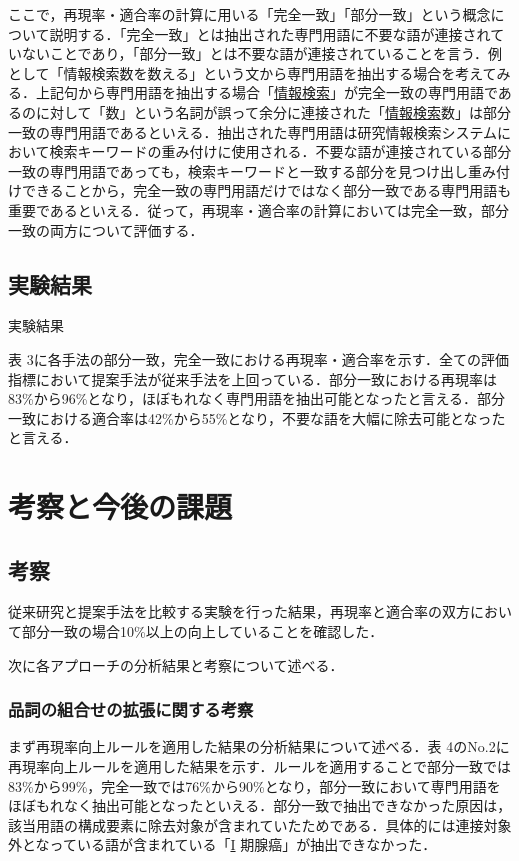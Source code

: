 \documentclass[japanese]{jnlp_1.4}
\begin{document}
ここで，再現率・適合率の計算に用いる「完全一致」「部分一致」という概念について説明する．「完全一致」とは抽出された専門用語に不要な語が連接されていないことであり，「部分一致」とは不要な語が連接されていることを言う．例として「情報検索数を数える」という文から専門用語を抽出する場合を考えてみる．上記句から専門用語を抽出する場合「\ul{情報検索}」が完全一致の専門用語であるのに対して「数」という名詞が誤って余分に連接された「\ul{情報検索}数」は部分一致の専門用語であるといえる．抽出された専門用語は研究情報検索システムにおいて検索キーワードの重み付けに使用される．不要な語が連接されている部分一致の専門用語であっても，検索キーワードと一致する部分を見つけ出し重み付けできることから，完全一致の専門用語だけではなく部分一致である専門用語も重要であるといえる．従って，再現率・適合率の計算においては完全一致，部分一致の両方について評価する．

\subsection{実験結果}

\begin{table}[b]
\caption{実験結果}

\end{table}

表 3に各手法の部分一致，完全一致における再現率・適合率を示す．全ての評価指標において提案手法が従来手法を上回っている．部分一致における再現率は83{\%}から96{\%}となり，ほぼもれなく専門用語を抽出可能となったと言える．部分一致における適合率は42{\%}から55{\%}となり，不要な語を大幅に除去可能となったと言える．


\section{考察と今後の課題}

\subsection{考察}

従来研究と提案手法を比較する実験を行った結果，再現率と適合率の双方において部分一致の場合10{\%}以上の向上していることを確認した．

次に各アプローチの分析結果と考察について述べる．

\subsubsection{品詞の組合せの拡張に関する考察}

まず再現率向上ルールを適用した結果の分析結果について述べる．表 4のNo.2に再現率向上ルールを適用した結果を示す．ルールを適用することで部分一致では83{\%}から99{\%}，完全一致では76{\%}から90{\%}となり，部分一致において専門用語をほぼもれなく抽出可能となったといえる．部分一致で抽出できなかった原因は，該当用語の構成要素に除去対象が含まれていたためである．具体的には連接対象外となっている語が含まれている「\ul{I} 期腺癌」が抽出できなかった．
\end{document}
